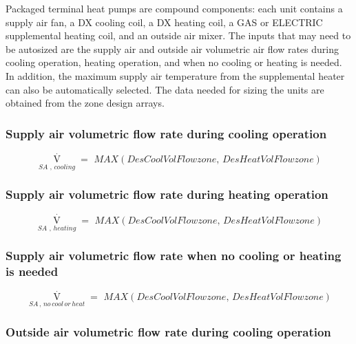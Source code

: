 Packaged terminal heat pumps are compound components: each unit contains a supply air fan, a DX cooling coil, a DX heating coil, a GAS or ELECTRIC supplemental heating coil, and an outside air mixer. The inputs that may need to be autosized are the supply air and outside air volumetric air flow rates during cooling operation, heating operation, and when no cooling or heating is needed. In addition, the maximum supply air temperature from the supplemental heater can also be automatically selected. The data needed for sizing the units are obtained from the zone design arrays.

\subsubsection{Supply air volumetric flow rate during cooling operation}\label{supply-air-volumetric-flow-rate-during-cooling-operation}

\begin{equation}
{\mathop V\limits^ \cdot_{SA\,\,,\,cooling}} = \,\,MAX(DesCoolVolFlowzone,\,DesHeatVolFlowzone)
\end{equation}

\subsubsection{Supply air volumetric flow rate during heating operation}\label{supply-air-volumetric-flow-rate-during-heating-operation}

\begin{equation}
{\mathop V\limits^ \cdot_{SA\,\,,\,heating}} = \,\,MAX(DesCoolVolFlowzone,\,DesHeatVolFlowzone)
\end{equation}

\subsubsection{Supply air volumetric flow rate when no cooling or heating is needed}\label{supply-air-volumetric-flow-rate-when-no-cooling-or-heating-is-needed}

\begin{equation}
{\mathop V\limits^ \cdot_{SA\,,\,no\,cool\,or\,heat}} = \,\,MAX(DesCoolVolFlowzone,\,DesHeatVolFlowzone)
\end{equation}

\subsubsection{Outside air volumetric flow rate during cooling operation}\label{outside-air-volumetric-flow-rate-during-cooling-operation}

